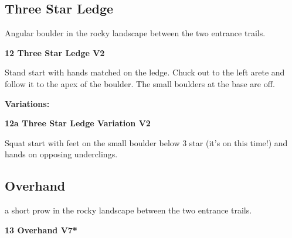 \begin{multicols}{2}
\begin{minipage}{\columnwidth}
			\subsection*{Three Star Ledge}\label{bf:Three Star Ledge}
			Angular boulder in the rocky landscape between the two entrance trails.
			
			\end{minipage}
			

					\begin{minipage}{\linewidth}	
					\label{rt:Three Star Ledge}
\colorbox{green!20}{
\parbox{0.95\textwidth}{
\textbf{
12 Three Star Ledge V2    
}
}
}

					\begin{adjustwidth}{0.5cm}{}				
					Stand start with hands matched on the ledge. Chuck out to the left arete and follow it to the apex of the boulder. The small boulders at the base are off.
					\end{adjustwidth}
					\end{minipage}
						\begin{adjustwidth}{0.5cm}{}				
						\textbf{Variations:} \newline
							\begin{minipage}{\linewidth}	
							\label{vr:Three Star Ledge Variation}
\colorbox{green!20}{
\parbox{0.95\textwidth}{
\textbf{
12a Three Star Ledge Variation V2    
}
}
}

							\begin{adjustwidth}{0.5cm}{}				
							Squat start with feet on the small boulder below 3 star (it's on this time!) and hands on opposing underclings.
							\end{adjustwidth}
							\end{minipage}
						\end{adjustwidth}
			\begin{minipage}{\columnwidth}
			\subsection*{Overhand}\label{bf:Overhand}
			a short prow in the rocky landscape between the two entrance trails.
			
			\end{minipage}
			

					\begin{minipage}{\linewidth}	
					\label{rt:Overhand}
\colorbox{Goldenrod!50}{
\parbox{0.95\textwidth}{
\textbf{
13 Overhand V7*  
}
}
}


\end{minipage}
\end{multicols}
